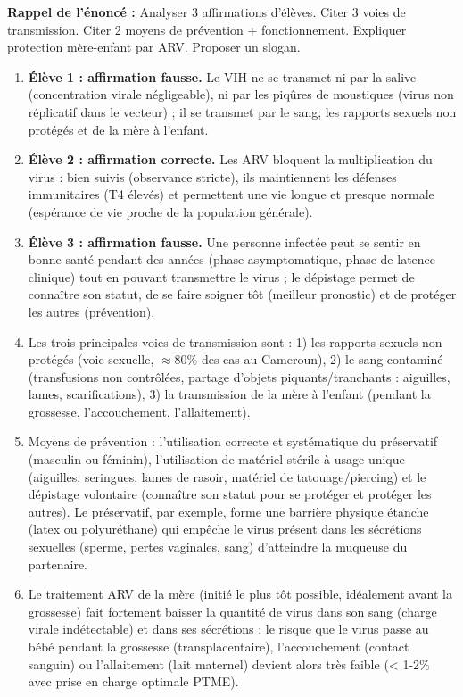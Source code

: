 \documentclass[11pt]{article}
\newcommand{\cle}[1]{{\popxbold\color{popdark}#1}}
\begin{document}
\begin{corrige}
\textbf{Rappel de l'énoncé :} Analyser 3 affirmations d'élèves. Citer 3 voies de transmission. Citer 2 moyens de prévention + fonctionnement. Expliquer protection mère-enfant par ARV. Proposer un slogan.
\tcblower
\begin{enumerate}
\item \textbf{Élève 1 : affirmation fausse.} Le VIH ne se transmet ni par la salive (concentration virale négligeable), ni par les piqûres de moustiques (virus non réplicatif dans le vecteur) ; il se transmet par le sang, les rapports sexuels non protégés et de la mère à l'enfant.
\item \textbf{Élève 2 : affirmation correcte.} Les ARV bloquent la multiplication du virus : bien suivis (observance stricte), ils maintiennent les défenses immunitaires (T4 élevés) et permettent une vie longue et presque normale (espérance de vie proche de la population générale).
\item \textbf{Élève 3 : affirmation fausse.} Une personne infectée peut se sentir en bonne santé pendant des années (phase asymptomatique, phase de latence clinique) tout en pouvant transmettre le virus ; le dépistage permet de connaître son statut, de se faire soigner tôt (meilleur pronostic) et de protéger les autres (prévention).
\item Les trois principales voies de transmission sont : 1) les rapports sexuels non protégés (voie sexuelle, $\approx 80\%$ des cas au Cameroun), 2) le sang contaminé (transfusions non contrôlées, partage d'objets piquants/tranchants : aiguilles, lames, scarifications), 3) la transmission de la mère à l'enfant (pendant la grossesse, l'accouchement, l'allaitement).
\item Moyens de prévention : l'utilisation correcte et systématique du \cle{préservatif} (masculin ou féminin), l'utilisation de matériel stérile à usage unique (aiguilles, seringues, lames de rasoir, matériel de tatouage/piercing) et le \cle{dépistage} volontaire (connaître son statut pour se protéger et protéger les autres). Le préservatif, par exemple, forme une barrière physique étanche (latex ou polyuréthane) qui empêche le virus présent dans les sécrétions sexuelles (sperme, pertes vaginales, sang) d'atteindre la muqueuse du partenaire.
\item Le traitement ARV de la mère (initié le plus tôt possible, idéalement avant la grossesse) fait fortement baisser la quantité de virus dans son sang (charge virale indétectable) et dans ses sécrétions : le risque que le virus passe au bébé pendant la grossesse (transplacentaire), l'accouchement (contact sanguin) ou l'allaitement (lait maternel) devient alors très faible (< 1-2\% avec prise en charge optimale PTME).

\end{enumerate}
\end{corrige}
\end{document}
